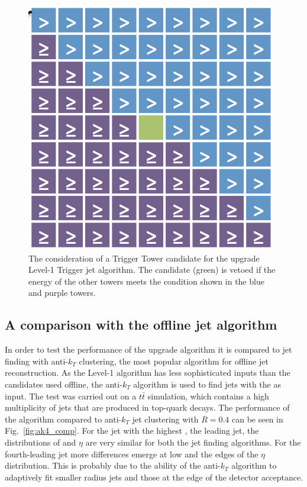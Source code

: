 \begin{figure}
	\begin{center}
		\includegraphics[width=0.3\linewidth]{figs/trigger/stage2_jetalgo}
  \end{center} \caption{The consideration of a Trigger Tower candidate
  for the upgrade Level-1 Trigger jet algorithm. The candidate (green)
  is vetoed if the energy of the other towers meets the condition
  shown in the blue and purple towers.}
	\label{fig:stage2_jetalgo}
\end{figure}

\subsection{A comparison with the offline jet algorithm}

In order to test the performance of the upgrade algorithm it is compared to
jet finding with anti-$k_T$ clustering, the most popular algorithm
for offline jet reconstruction. As the Level-1 algorithm has less
sophisticated inputs than the \PF candidates used offline, the
anti-$k_T$ algorithm is used to find jets with the \TTs as input. The test was
carried out on a $t\bar{t}$ \MC simulation, which contains a high
multiplicity of jets that are produced in top-quark decays. The performance of
the algorithm compared to anti-$k_T$ jet clustering with $R=0.4$ can
be seen in Fig.~\ref{fig:ak4_comp}. For the jet with the highest \pT,
the leading jet, the distributions of \pT and $\eta$ are very similar
for both the jet finding algorithms. For the fourth-leading jet more
differences emerge at low \pT and the edges of the $\eta$
distribution. This is probably due to the ability of the anti-$k_T$
algorithm to adaptively fit smaller radius jets and those at the edge
of the detector acceptance.

